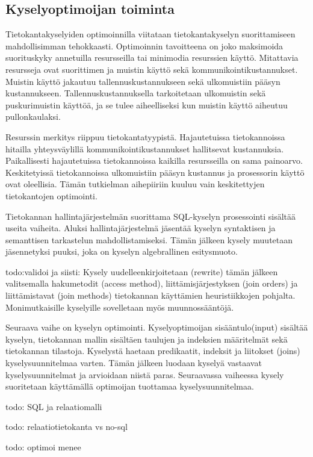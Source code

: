 \documentclass[finnish]{tktltiki2}
\theoremstyle{definition}
\theoremstyle{remark}
\begin{document}
\subsection{Kyselyoptimoijan toiminta}
Tietokantakyselyiden optimoinnilla viitataan tietokantakyselyn suorittamiseen mahdollisimman tehokkaasti. Optimoinnin tavoitteena on joko maksimoida suorituskyky annetuilla resursseilla tai minimodia resurssien käyttö. Mitattavia resursseja ovat suorittimen ja muistin käyttö sekä kommunikointikustannukset. Muistin käyttö jakautuu tallennuskustannukseen sekä ulkomuistiin pääsyn kustannukseen. Tallennuskustannuksella tarkoitetaan ulkomuistin sekä puskurimuistin käyttöä, ja se tulee aiheelliseksi kun muistin käyttö aiheutuu pullonkaulaksi. 

Resurssin merkitys riippuu tietokantatyypistä. Hajautetuissa tietokannoissa hitailla yhteysväylillä kommunikointikustannukset hallitsevat kustannuksia. Paikallisesti hajautetuissa tietokannoissa kaikilla resursseilla on sama painoarvo. Keskitetyissä tietokannoissa ulkomuistiin pääsyn kustannus ja prosessorin käyttö ovat oleellisia. Tämän tutkielman aihepiiriin kuuluu vain keskitettyjen tietokantojen optimointi.

Tietokannan hallintajärjestelmän suorittama SQL-kyselyn prosessointi sisältää useita vaiheita. Aluksi hallintajärjestelmä jäsentää kyselyn syntaktisen ja semanttisen tarkastelun mahdollistamiseksi. Tämän jälkeen kysely muutetaan jäsennetyksi puuksi, joka on kyselyn algebrallinen esitysmuoto. \cite{mahajan2012}

todo:validoi ja siisti: Kysely uudelleenkirjoitetaan (rewrite) tämän jälkeen valitsemalla hakumetodit (access method), liittämisjärjestyksen (join orders) ja liittämistavat (join methods) tietokannan käyttämien heuristiikkojen pohjalta. Monimutkaisille kyselyille sovelletaan myös muunnossääntöjä. \cite{mahajan2012}

Seuraava vaihe on kyselyn optimointi. Kyselyoptimoijan sisääntulo(input) sisältää kyselyn, tietokannan mallin sisältäen taulujen ja indeksien määritelmät sekä tietokannan tilastoja. Kyselystä haetaan predikaatit, indeksit ja liitokset (joins) kyselysuunnitelmaa varten. Tämän jälkeen luodaan kyselyä vastaavat kyselysuunnitelmat ja arvioidaan niistä paras. Seuraavassa vaiheessa kysely suoritetaan käyttämällä optimoijan tuottamaa kyselysuunnitelmaa.

todo: SQL ja relaatiomalli

todo: relaatiotietokanta vs no-sql

todo: optimoi menee
\end{document}
